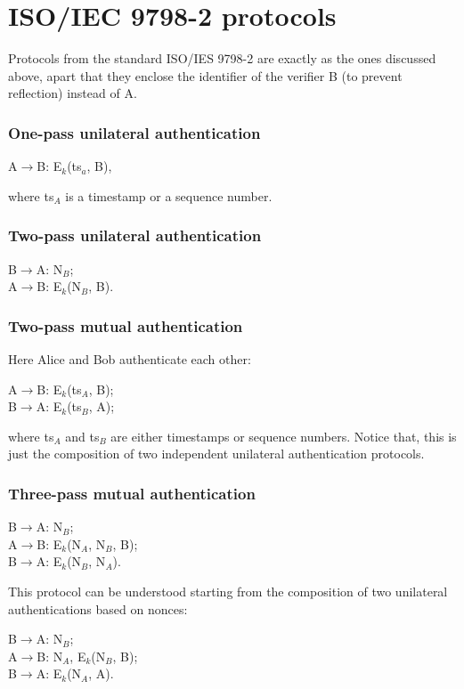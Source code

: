 \documentclass[a4paper, 12pt]{report}
\begin{document}
\section*{ISO/IEC 9798-2 protocols}
Protocols from the standard ISO/IES 9798-2 are exactly as the ones discussed above, apart that they enclose the identifier of the verifier B (to prevent reflection) instead of A.

\subsubsection{One-pass unilateral authentication}
\begin{center}
	A$\rightarrow$B: E$_k$(ts$_a$, B),
\end{center}
where ts$_A$ is a timestamp or a sequence number.

\subsubsection{Two-pass unilateral authentication}
\begin{center}
	B$\rightarrow$A: N$_B$;\\
	A$\rightarrow$B: E$_k$(N$_B$, B).
\end{center}

\subsubsection{Two-pass mutual authentication}
Here Alice and Bob authenticate each other:
\begin{center}
	A$\rightarrow$B: E$_k$(ts$_A$, B);\\
	B$\rightarrow$A: E$_k$(ts$_B$, A);
\end{center}
where ts$_A$ and ts$_B$ are either timestamps or sequence numbers. Notice that, this is just the composition of two independent unilateral authentication protocols.

\subsubsection{Three-pass mutual authentication}
\begin{center}
	B$\rightarrow$A: N$_B$;\\
	A$\rightarrow$B: E$_k$(N$_A$, N$_B$, B);\\
	B$\rightarrow$A: E$_k$(N$_B$, N$_A$).
\end{center}
This protocol can be understood starting from the composition of two unilateral authentications based on nonces:
\begin{center}
	B$\rightarrow$A: N$_B$;\\
	A$\rightarrow$B: N$_A$, E$_k$(N$_B$, B);\\
	B$\rightarrow$A: E$_k$(N$_A$, A).
\end{center}
\end{document}
